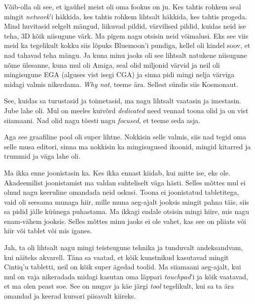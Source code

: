 Võib-olla oli see, et igaühel meist oli oma fookus on ju. Kes tahtis rohkem seal mingit \emph{network}'i häkkida, kes tahtis rohkem lihtsalt häkkida, kes tahtis progeda. Mind huvitasid selgelt mängud, liikuvad pildid, värvilised pildid, kuidas neid ise teha, 3D kõik niisugune värk. Ma pigem nagu otsisin neid võimalusi. Eks see viis meid ka tegelikult kokku siis lõpuks Bluemoon'i pundiga, kellel oli  kindel soov, et nad tahavad teha mängu. Ja kuna minu jaoks oli see lihtsalt natukene niisugune nõme ülesanne, kuna mul oli Amiga, seal olid miljonid värvid ja neil oli mingisugune EGA (alguses vist isegi CGA) ja sinna pidi mingi nelja värviga midagi valmis nikerdama. \emph{Why not}, teeme ära. Sellest sündis siis Kosmonaut. 

See, kuidas sa turustasid ja toimetasid, ma nagu lihtsalt vaatasin ja imestasin. Jube lahe oli. Mul on meeles kuivõrd \emph{dedicated} need vennad toona olid ja on vist siiamaani. Nad olid nagu tõesti nagu \emph{focused}, et teeme seda asja. 

Aga see graafiline pool oli super lihtne. Nokkisin selle valmis, siis nad tegid oma selle musa editori, sinna ma nokkisin ka mingisugused ikoonid, mingid kitarred ja  trummid ja väga lahe oli.


Ma ikka enne joonistasin ka. Kes ikka ennast kiidab, kui mitte ise, eks ole. Akadeemilist joonistamist ma valdan  suhteliselt väga hästi. Selles mõttes mul ei olnud nagu keeruline omandada neid oskusi. Toona ei joonistatud tabletitega, vaid oli seesama munaga hiir, mille muna aeg-ajalt jooksis mingit pahna täis, siis sa pidid jälle küünega puhastama. Ma ikkagi endale otsisin mingi hiire, mis nagu enam-vähem jooksis. Selles mõttes minu jaoks ei ole vahet, kas see on pliiats või hiir või tablet või mis iganes. 


Jah, ta oli lihtsalt nagu mingi teistsugune tehnika ja tunduvalt andeksandvam, kui näiteks akvarell. Täna sa vaatad, et  kõik kunstnikud kasutavad mingit Cintiq'u tabletti, neil on kõik super ägedad toolid. Ma siiamaani aeg-ajalt, kui mul on vaja nikeradada midagi kasutan oma läppari \emph{touchpad}'i ja kõik vaatavad, et ma olen peast soe. See on mugav ja käe järgi \emph{tool} tegelikult, kui sa ta ära omandad ja keerad kursori piisavalt kiireks.

